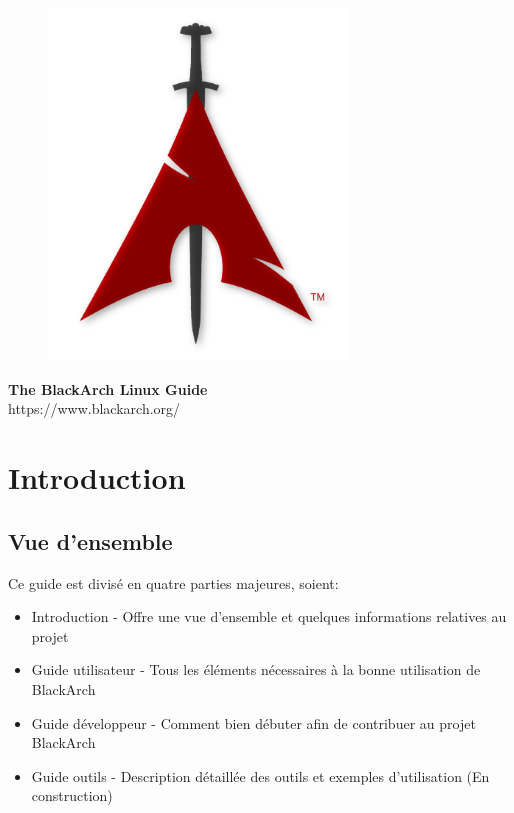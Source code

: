 \documentclass[a4paper, oneside, 11pt]{book}
\begin{document}
\pagestyle{empty}
\begin{center}
\begin{figure}[htbp]
\centering
\vspace{0.5cm}
\includegraphics[width=8cm]{images/logo.png}
\label{fig:logo}
\end{figure}
\vspace{0.5cm}
\Huge{\textbf{The BlackArch Linux Guide}}\\
\vspace{1cm}
\Large{\color{red}https://www.blackarch.org/}\\
\vspace{0.5cm}
\end{center}
\newpage
\tableofcontents
\newpage
\pagestyle{fancy}


\chapter{Introduction}

\section{Vue d'ensemble}

Ce guide est divis\'{e} en quatre parties majeures, soient:
\begin{itemize}
\item Introduction - Offre une vue d'ensemble et quelques informations relatives au projet
\item Guide utilisateur - Tous les \'{e}l\'{e}ments n\'{e}cessaires \`{a} la bonne utilisation de BlackArch
\item Guide d\'{e}veloppeur - Comment bien d\'{e}buter afin de contribuer au projet BlackArch
\item Guide outils - Description d\'{e}taill\'{e}e des outils et exemples d'utilisation (En construction)
\end{itemize}
\end{document}
